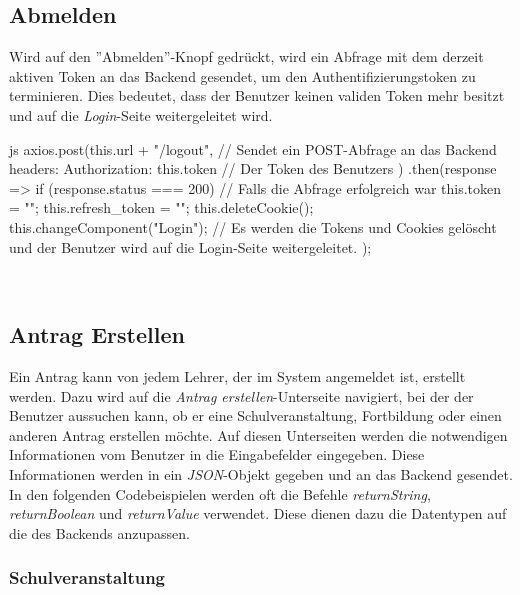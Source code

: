 \subsection{Abmelden}
Wird auf den ''Abmelden''-Knopf gedrückt, wird ein Abfrage mit dem derzeit aktiven Token an das Backend gesendet, um den Authentifizierungstoken zu terminieren. Dies bedeutet, dass der Benutzer keinen validen Token mehr besitzt und auf die \textit{Login}-Seite weitergeleitet wird.
\begin{code}{js}
axios.post(this.url + "/logout", {	// Sendet ein POST-Abfrage an das Backend
	headers: { Authorization: this.token }	// Der Token des Benutzers
})
.then(response => {
	if (response.status === 200) {	// Falls die Abfrage erfolgreich war
		this.token = "";
		this.refresh_token = "";
		this.deleteCookie();
		this.changeComponent("Login");	// Es werden die Tokens und Cookies gelöscht und der Benutzer wird auf die Login-Seite weitergeleitet.
	}
});
\end{code}
~\\
\newpage
\subsection{Antrag Erstellen}
Ein Antrag kann von jedem Lehrer, der im System angemeldet ist, erstellt werden. Dazu wird auf die \textit{Antrag erstellen}-Unterseite navigiert, bei der der Benutzer aussuchen kann, ob er eine Schulveranstaltung, Fortbildung oder einen anderen Antrag erstellen möchte. Auf diesen Unterseiten werden die notwendigen Informationen vom Benutzer in die Eingabefelder eingegeben. Diese Informationen werden in ein \textit{JSON}-Objekt gegeben und an das Backend gesendet.
\\
In den folgenden Codebeispielen werden oft die Befehle \textit{returnString}, \textit{returnBoolean} und \textit{returnValue} verwendet. Diese dienen dazu die Datentypen auf die des Backends anzupassen. 
\subsubsection{Schulveranstaltung}
